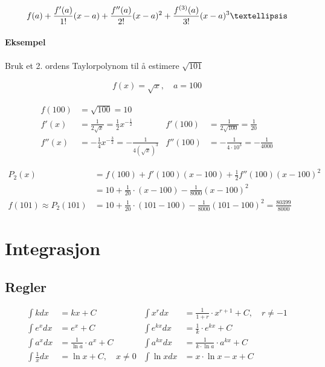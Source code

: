 \documentclass[12pt,norsk,a4paper]{article}
\begin{document}
\begin{equation}
f(a) + \frac{f'(a)}{1!}(x - a) + \frac{f''(a)}{2!}(x - a)^{2} + \frac{f^{(3)}(a)}{3!}(x - a)^{3} \textellipsis
\end{equation}

\paragraph*{Eksempel} Bruk et 2. ordens Taylorpolynom til å estimere $\sqrt{101}$

\begin{align*}
f(x) = \sqrt{x}, \quad a = 100
\end{align*}

\begin{align*}
f(100) &= \sqrt{100} = 10	\\
f'(x) &= \frac{1}{2\sqrt{x}} = \frac{1}{2}x^{-\frac{1}{2}}	&	f'(100) &= \frac{1}{2\sqrt{100}} = \frac{1}{20}	\\
f''(x) &= - \frac{1}{4}x^{- \frac{3}{2}} = - \frac{1}{4(\sqrt{x})^{3}}	&	f''(100) &= - \frac{1}{4 \cdot 10^3} = - \frac{1}{4000}
\end{align*}

\begin{align*}
P_{2}(x) &= f(100) + f'(100)(x - 100) + \frac{1}{2} f''(100)(x-100)^2	\\
&= 10 + \frac{1}{20} \cdot (x - 100) - \frac{1}{8000}(x - 100)^2	\\
f(101) \approx P_{2}(101) &= 10 + \frac{1}{20} \cdot (101 - 100) - \frac{1}{8000}(101 - 100)^2 = \frac{80399}{8000}
\end{align*}



\newpage













\section{Integrasjon}

\subsection*{Regler}
\begin{align*}
\int k dx &=	kx + C		&		\int x^{r} dx &= \frac{1}{1+r} \cdot x^{r+1} + C, \quad r \neq -1		\\
\int e^{x} dx &= e^{x} + C		&		\int e^{kx} dx &= \frac{1}{k} \cdot e^{kx} + C	\\
\int a^{x} dx &= \frac{1}{\ln a} \cdot a^{x} + C	&	\int a^{kx} dx &= \frac{1}{k \cdot \ln a} \cdot a^{kx} + C	\\
\int \frac{1}{x} dx &= \ln x + C, \quad x \neq 0	&	\int \ln x dx &= x \cdot \ln x - x + C
\end{align*}
\end{document}
